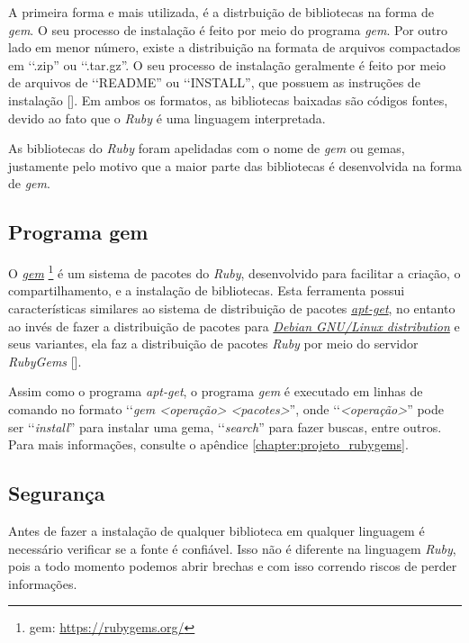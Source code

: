 A primeira forma e mais utilizada, é a distrbuição de bibliotecas na forma de \emph{gem}. O seu processo
de instalação é feito por meio do programa \emph{gem}. Por outro lado em menor número, existe a
distribuição na formata de arquivos compactados em ‘‘.zip'' ou ‘‘.tar.gz''. O seu processo de instalação
geralmente é feito por meio de arquivos de ‘‘README'' ou ‘‘INSTALL'', que possuem as instruções de
instalação []. Em ambos os formatos, as bibliotecas baixadas são códigos fontes,
devido ao fato que o \emph{Ruby} é uma linguagem interpretada.

As bibliotecas do \emph{Ruby} foram apelidadas com o nome de \emph{gem} ou gemas, justamente pelo
motivo que a maior parte das bibliotecas é desenvolvida na forma de \emph{gem}.


\subsection{Programa gem}
\label{subsection:programa_gem}

O \emph{\href{https://rubygems.org/}{gem}} \footnote{gem: \url{https://rubygems.org/}} é um sistema
de pacotes do \emph{Ruby}, desenvolvido para facilitar a criação, o compartilhamento, e a instalação de
bibliotecas. Esta ferramenta possui características similares ao sistema de distribuição de pacotes
\emph{\href{https://packages.qa.debian.org/a/apt.html}{apt-get}}, no entanto ao invés de fazer a distribuição
de pacotes para \emph{\href{https://www.debian.org/}{Debian GNU/Linux distribution}} e seus variantes, ela faz
a distribuição de pacotes \emph{Ruby} por meio do servidor \emph{RubyGems} [].

Assim como o programa \emph{apt-get}, o programa \emph{gem} é executado em linhas de comando no formato
‘‘\emph{gem <operação> <pacotes>}'', onde ‘‘\emph{<operação>}'' pode ser ‘‘\emph{install}'' para instalar uma
gema, ‘‘\emph{search}'' para fazer buscas, entre outros. Para mais informações, consulte o apêndice
\ref{chapter:projeto_rubygems}.


\subsection{Segurança}
\label{subsection:segurança_biblioteca_ruby}

Antes de fazer a instalação de qualquer biblioteca em qualquer linguagem é necessário verificar
se a fonte é confiável. Isso não é diferente na linguagem \emph{Ruby}, pois a todo momento podemos
abrir brechas e com isso correndo riscos de perder informações.

